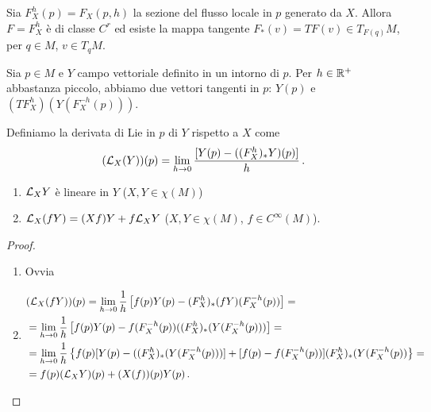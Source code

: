 Sia $F_X^h(p)=F_X(p,h)$ la sezione del flusso locale in $p$ generato da $X$. Allora $F=F_X^h$ è di classe $C^r$ ed esiste la mappa tangente $F_*(v)=TF(v)\in T_{F(q)}M$, per $q\in M$, $v\in T_qM$.

Sia $p\in M$ e $Y$ campo vettoriale definito in un intorno di $p$. Per $h\in\mathbb R^+$ abbastanza piccolo, abbiamo due vettori tangenti in $p$: $Y(p)$ e $(TF_X^h)(Y(F_X^{-h}(p)))$.

\begin{definition}
	Definiamo la derivata di Lie in $p$ di $Y$ rispetto a $X$ come \begin{equation*}(\mathcal L_X(Y))(p)=\lim_{h\to 0}\frac{[Y(p)-((F_X^h)_*Y)(p)]}h \, \text{. }
	\end{equation*}
\end{definition}

\begin{proposition}
	\begin{enumerate}
		\item $\mathcal L_XY$ è lineare in $Y$ ($X,Y\in\chi(M)$)
		\item $\mathcal L_X(fY)=(Xf)Y+f\mathcal L_XY$ ($X,Y\in\chi(M)$, $f\in C^\infty(M)$).
	\end{enumerate}
\end{proposition}

\begin{proof}
	\begin{enumerate}
	 \item Ovvia
	 \item 
	 \begin{align*}
	 &(\mathcal L_X(fY))(p)=\lim_{h\to 0} \frac 1h \left[f(p)Y(p)-(F_X^h)_*(fY)(F_X^{-h}(p))\right]=\\
	 &=\lim_{h\to 0}\frac 1h \left[f(p)Y(p)-f(F_X^{-h}(p)) ((F_X^h)_*(Y(F_X^{-h}(p)))\right]=\\
	 &=\lim_{h\to 0}\frac 1h \left\{f(p)[Y(p)-((F_X^h)_*(Y(F_X^{-h}(p)))]+[f(p)-f(F_X^{-h}(p))](F_X^h)_*(Y(F_X^{-h}(p))\right\}=\\
	 &=f(p)(\mathcal L_XY)(p)+(X(f))(p)Y(p) \, \text{. }
	 \end{align*}
	 \end{enumerate}

\end{proof}




